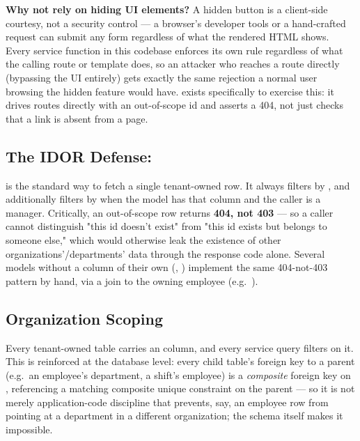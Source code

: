 \textbf{Why not rely on hiding UI elements?} A hidden button is a
client-side courtesy, not a security control --- a browser's developer
tools or a hand-crafted  request can submit any form
regardless of what the rendered HTML shows. Every service function in
this codebase enforces its own rule regardless of what the calling
route or template does, so an attacker who reaches a route directly
(bypassing the UI entirely) gets exactly the same rejection a normal
user browsing the hidden feature would have. 
exists specifically to exercise this: it drives routes directly with an
out-of-scope id and asserts a 404, not just checks that a link is
absent from a page.

\subsection*{The IDOR Defense: }

 is the
standard way to fetch a single tenant-owned row. It always filters by
, and additionally filters by
 when the model has that column and the caller is
a manager. Critically, an out-of-scope row returns \textbf{404, not
403} --- so a caller cannot distinguish "this id doesn't exist" from
"this id exists but belongs to someone else," which would otherwise
leak the existence of other organizations'/departments' data through
the response code alone. Several models without a 
column of their own (, )
implement the same 404-not-403 pattern by hand, via a join to the
owning employee (e.g.\ ).

\subsection*{Organization Scoping}

Every tenant-owned table carries an  column, and
every service query filters on it. This is reinforced at the database
level: every child table's foreign key to a parent (e.g.\ an employee's
department, a shift's employee) is a \emph{composite} foreign key on
, referencing a matching composite
unique constraint on the parent --- so it is not merely
application-code discipline that prevents, say, an employee row from
pointing at a department in a different organization; the schema itself
makes it impossible.

